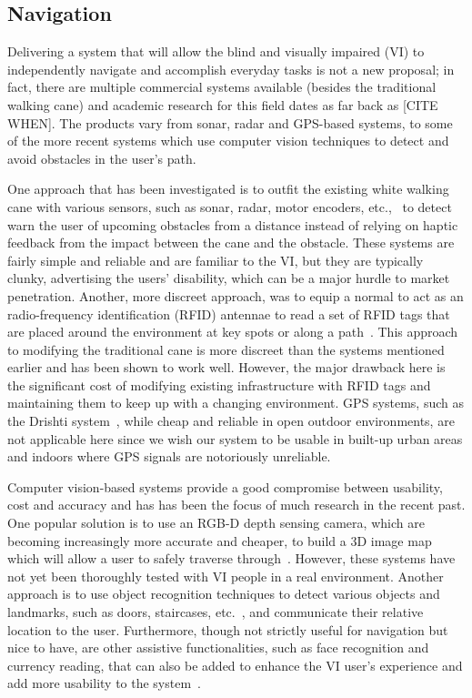 \documentclass[format=sigconf, review=true, screen=true, anonymous=true]{acmart}
\begin{document}
\subsection{Navigation}

Delivering a system that will allow the blind and visually impaired (VI) to independently navigate and accomplish everyday tasks is not a new proposal; in fact, there are multiple commercial systems available (besides the traditional walking cane) and academic research for this field dates as far back as [CITE WHEN]. The products vary from sonar, radar and GPS-based systems, to some of the more recent systems which use computer vision techniques to detect and avoid obstacles in the user's path. 

One approach that has been investigated is to outfit the existing white walking cane with various sensors, such as sonar, radar, motor encoders, etc.,~\cite{ulrich1997, marion2008batcane} to detect warn the user of upcoming obstacles from a distance instead of relying on haptic feedback from the impact between the cane and the obstacle. These systems are fairly simple and reliable and are familiar to the VI, but they are typically clunky, advertising the users' disability, which can be a major hurdle to market penetration. Another, more discreet approach, was to equip a normal to act as an radio-frequency identification (RFID) antennae to read a set of RFID tags that are placed around the environment at key spots or along a path~\cite{faria2010electronic, willis2005}. This approach to modifying the traditional cane is more discreet than the systems mentioned earlier and has been shown to work well. However, the major drawback here is the significant cost of modifying existing infrastructure with RFID tags and maintaining them to keep up with a changing environment. GPS systems, such as the Drishti system~\cite{ran2004drishti}, while cheap and reliable in open outdoor environments, are not applicable here since we wish our system to be usable in built-up urban areas and indoors where GPS signals are notoriously unreliable. 

Computer vision-based systems provide a good compromise between usability, cost and accuracy and has has been the focus of much research in the recent past. One popular solution is to use an RGB-D depth sensing camera, which are becoming increasingly more accurate and cheaper, to build a 3D image map which will allow a user to safely traverse through~\cite{lee2015, rodriguez2012obstacle}. However, these systems have not yet been thoroughly tested with VI people in a real environment. Another approach is to use object recognition techniques to detect various objects and landmarks, such as doors, staircases, etc.~\cite{tian2013b}, and communicate their relative location to the user. Furthermore, though not strictly useful for navigation but nice to have, are other assistive functionalities, such as face recognition and currency reading, that can also be added to enhance the VI user's experience and add more usability to the system~\cite{chessa2016}.
\end{document}
